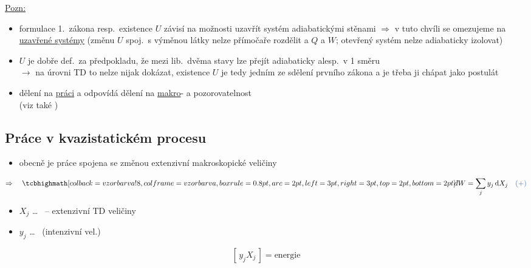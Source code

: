 \underline{Pozn:}
\begin{itemize}
  \item formulace 1.\ zákona resp.\ existence $U$ závisí na možnosti uzavřít systém adiabatickými stěnami $\Rightarrow$ v tuto chvíli se omezujeme na \underline{uzavřené systémy} (změnu $U$ spoj.\ s výměnou látky nelze přímočaře rozdělit a $Q$ a $W$; otevřený systém nelze adiabaticky izolovat)
  \item $U$ je dobře def.\ za předpokladu, že mezi lib.\ dvěma stavy lze přejít adiabaticky alesp.\ v 1 směru \\
        $\to$ na úrovni TD to nelze nijak dokázat, existence $U$ je tedy jedním ze sdělení prvního zákona a je třeba ji chápat jako postulát
  \item dělení na \underline{práci} a  odpovídá dělení na \underline{makro}- a  pozorovatelnost \\
        (viz také )
\end{itemize}

\subsection{Práce v kvazistatickém procesu}
\begin{itemize}
  \item obecně je práce spojena se změnou extenzivní makroskopické veličiny
\end{itemize}

\begin{minipage}[t]{0.45\textwidth}
\[
  \Rightarrow\quad \vzorec{\dbar W = \sum_j y_j\,\dd X_j} \quad \modre{(+)}
\]
\end{minipage}
\hfill
\begin{minipage}[t]{0.5\textwidth}
\begin{itemize}
  \item $X_j$ \dots\  -- extenzivní TD veličiny
  \item $y_j$ \dots\  (intenzivní vel.)
\end{itemize}
\[ [\,y_jX_j\,] = \text{energie} \]
\end{minipage}

